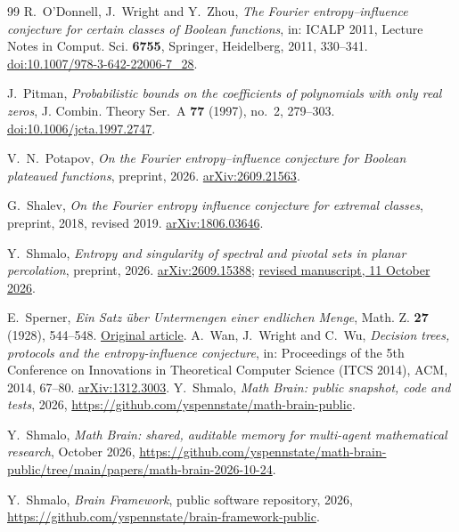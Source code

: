 \documentclass[11pt]{amsart}
\theoremstyle{definition}
\theoremstyle{remark}
\begin{document}
\begin{thebibliography}{99}
R.~O'Donnell, J.~Wright and Y.~Zhou,
\emph{The Fourier entropy--influence conjecture for certain classes of Boolean functions},
in: ICALP 2011, Lecture Notes in Comput. Sci. \textbf{6755}, Springer, Heidelberg, 2011, 330--341.
\href{https://doi.org/10.1007/978-3-642-22006-7_28}{doi:10.1007/978-3-642-22006-7\_28}.

J.~Pitman,
\emph{Probabilistic bounds on the coefficients of polynomials with only real zeros},
J. Combin. Theory Ser.~A \textbf{77} (1997), no.~2, 279--303.
\href{https://doi.org/10.1006/jcta.1997.2747}{doi:10.1006/jcta.1997.2747}.

V.~N.~Potapov,
\emph{On the Fourier entropy--influence conjecture for Boolean plateaued functions},
preprint, 2026.
\href{https://arxiv.org/abs/2609.21563}{arXiv:2609.21563}.

G.~Shalev,
\emph{On the Fourier entropy influence conjecture for extremal classes},
preprint, 2018, revised 2019.
\href{https://arxiv.org/abs/1806.03646}{arXiv:1806.03646}.

Y.~Shmalo,
\emph{Entropy and singularity of spectral and pivotal sets in planar percolation},
preprint, 2026.
\href{https://arxiv.org/abs/2609.15388}{arXiv:2609.15388};
\href{https://github.com/yspennstate/percolation-crossing-entropy}{revised manuscript, 11 October 2026}.

E.~Sperner,
\emph{Ein Satz \"uber Untermengen einer endlichen Menge},
Math. Z. \textbf{27} (1928), 544--548.
\href{https://eudml.org/doc/167993}{Original article}.
A.~Wan, J.~Wright and C.~Wu,
\emph{Decision trees, protocols and the entropy-influence conjecture},
in: Proceedings of the 5th Conference on Innovations in Theoretical
Computer Science (ITCS 2014), ACM, 2014, 67--80.
\href{https://arxiv.org/abs/1312.3003}{arXiv:1312.3003}.
 Y.~Shmalo, \emph{Math Brain: public snapshot, code and tests}, 2026, \url{https://github.com/yspennstate/math-brain-public}.

 Y.~Shmalo, \emph{Math Brain: shared, auditable memory for multi-agent mathematical research}, October 2026, \url{https://github.com/yspennstate/math-brain-public/tree/main/papers/math-brain-2026-10-24}.

 Y.~Shmalo, \emph{Brain Framework}, public software repository, 2026, \url{https://github.com/yspennstate/brain-framework-public}.

\end{thebibliography}
\end{document}
